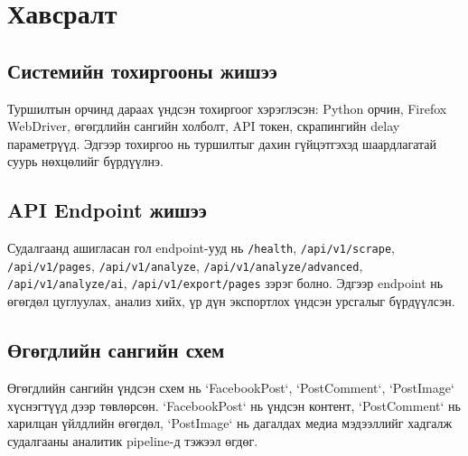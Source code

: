 \documentclass[12pt,a4paper]{report}
\begin{document}
\appendix
\chapter{Хавсралт}

\section{Системийн тохиргооны жишээ}

Туршилтын орчинд дараах үндсэн тохиргоог хэрэглэсэн: Python орчин, Firefox WebDriver, өгөгдлийн сангийн холболт, API токен, скрапингийн delay параметрүүд. Эдгээр тохиргоо нь туршилтыг дахин гүйцэтгэхэд шаардлагатай суурь нөхцөлийг бүрдүүлнэ.


\section{API Endpoint жишээ}

Судалгаанд ашигласан гол endpoint-ууд нь \texttt{/health}, \texttt{/api/v1/scrape}, \texttt{/api/v1/pages},
\texttt{/api/v1/analyze}, \texttt{/api/v1/analyze/advanced}, \texttt{/api/v1/analyze/ai},
\texttt{/api/v1/export/pages} зэрэг болно. Эдгээр endpoint нь өгөгдөл цуглуулах, анализ хийх,
үр дүн экспортлох үндсэн урсгалыг бүрдүүлсэн.


\section{Өгөгдлийн сангийн схем}

Өгөгдлийн сангийн үндсэн схем нь `FacebookPost`, `PostComment`, `PostImage` хүснэгтүүд дээр төвлөрсөн. `FacebookPost` нь үндсэн контент, `PostComment` нь харилцан үйлдлийн өгөгдөл, `PostImage` нь дагалдах медиа мэдээллийг хадгалж судалгааны аналитик pipeline-д тэжээл өгдөг.
\end{document}
